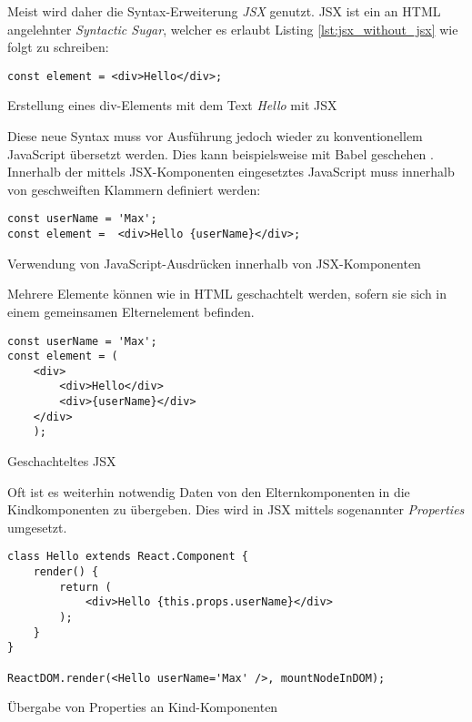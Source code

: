 Meist wird daher die Syntax-Erweiterung \textit{JSX} genutzt. JSX ist ein an HTML angelehnter \textit{Syntactic Sugar}, welcher es erlaubt Listing \ref{lst:jsx_without_jsx} wie folgt zu schreiben:
\begin{listing}[H]
    \begin{verbatim}
const element = <div>Hello</div>;
    \end{verbatim}
    \caption{Erstellung eines div-Elements mit dem Text \textit{Hello} mit JSX}
    \label{lst:jsx_with_jsx}
\end{listing}
Diese neue Syntax muss vor Ausführung jedoch wieder zu konventionellem JavaScript übersetzt werden. Dies kann beispielsweise mit Babel geschehen \cite{facebook_inc._introducing_2016}.
Innerhalb der mittels JSX-Komponenten eingesetztes JavaScript muss innerhalb von geschweiften Klammern definiert werden: 

\begin{listing}[H]
    \begin{verbatim}
const userName = 'Max';
const element =  <div>Hello {userName}</div>;
    \end{verbatim}
    \caption{Verwendung von JavaScript-Ausdrücken innerhalb von JSX-Komponenten}
    \label{lst:embedded_expression}
\end{listing}

Mehrere Elemente können wie in HTML geschachtelt werden, sofern sie sich in einem gemeinsamen Elternelement befinden.

\begin{listing}[H]
    \begin{verbatim}
const userName = 'Max';
const element = (
    <div>
        <div>Hello</div>
        <div>{userName}</div>
    </div>
    );
    \end{verbatim}
    \caption{Geschachteltes JSX}
    \label{lst:jsx_nested}
\end{listing}

Oft ist es weiterhin notwendig Daten von den Elternkomponenten in die Kindkomponenten zu übergeben. Dies wird in JSX mittels sogenannter \textit{Properties} umgesetzt.

\begin{listing}[H]
    \begin{verbatim}
class Hello extends React.Component {
    render() {
        return (
            <div>Hello {this.props.userName}</div>
        );
    }
}

ReactDOM.render(<Hello userName='Max' />, mountNodeInDOM);
    \end{verbatim}
    \caption{Übergabe von Properties an Kind-Komponenten}
    \label{lst:jsx_nested}
\end{listing}



